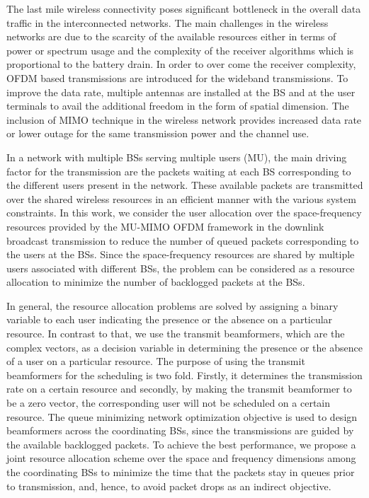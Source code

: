 
The last mile wireless connectivity poses significant bottleneck in the overall data traffic in the interconnected networks. The main challenges in the wireless networks are due to the scarcity of the available resources either in terms of power or spectrum usage and the complexity of the receiver algorithms which is proportional to the battery drain. In order to over come the receiver complexity, \ac{OFDM} based transmissions are introduced for the wideband transmissions. To improve the data rate, multiple antennas are installed at the \ac{BS} and at the user terminals to avail the additional freedom in the form of spatial dimension. The inclusion of \ac{MIMO} technique in the wireless network provides increased data rate or lower outage for the same transmission power and the channel use.

In a network with multiple \acp{BS} serving multiple users (\acs{MU}), the main driving factor for the transmission are the packets waiting at each \ac{BS} corresponding to the different users present in the network. These available packets are transmitted over the shared wireless resources in an efficient manner with the various system constraints. In this work, we consider the user allocation over the space-frequency resources provided by the \ac{MU-MIMO} \ac{OFDM} framework in the downlink broadcast transmission to reduce the number of queued packets corresponding to the users at the \acp{BS}. Since the space-frequency resources are shared by multiple users associated with different \acp{BS}, the problem can be considered as a resource allocation to minimize the number of backlogged packets at the \acp{BS}.

In general, the resource allocation problems are solved by assigning a binary variable to each user indicating the presence or the absence on a particular resource. In contrast to that, we use the transmit beamformers, which are the complex vectors, as a decision variable in determining the presence or the absence of a user on a particular resource. The purpose of using the transmit beamformers for the scheduling is two fold. Firstly, it determines the transmission rate on a certain resource and secondly, by making the transmit beamformer to be a zero vector, the corresponding user will not be scheduled on a certain resource. The queue minimizing network optimization objective is used to design beamformers across the coordinating \acp{BS}, since the transmissions are guided by the available backlogged packets. To achieve the best performance, we propose a joint resource allocation scheme over the space and frequency dimensions among the coordinating \acp{BS} to minimize the time that the packets stay in queues prior to transmission, and, hence, to avoid packet drops as an indirect objective.

